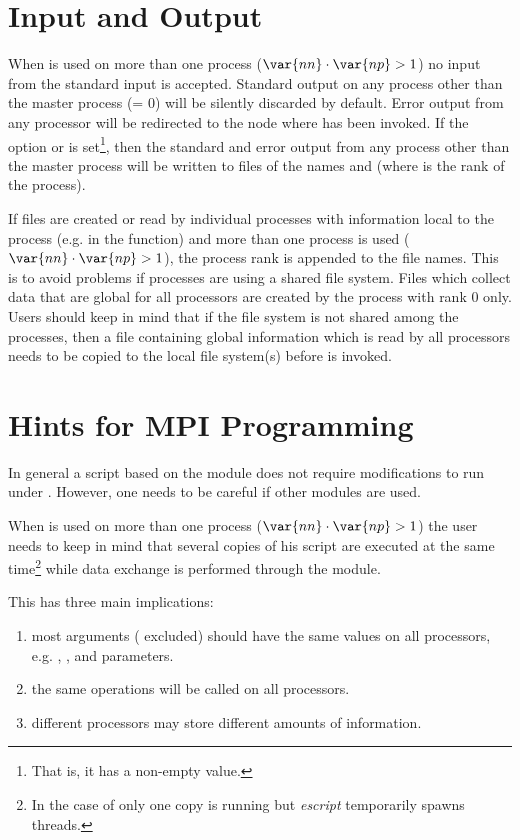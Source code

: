 \section{Input and Output}
When \MPI is used on more than one process ($\var{nn} \cdot \var{np} >1$) no
input from the standard input is accepted.
Standard output on any process other than the master process (= 0)
will be silently discarded by default.
Error output from any processor will be redirected to the node where  has been invoked.
If the  option or  is set\footnote{That is, it has a non-empty value.},
then the standard and error output from any process other than the master
process will be written to files of the names 
and  (where  is the rank of the process).

If files are created or read by individual \MPI processes with information
local to the process (e.g. in the  function)  and more than one
process is used ($\var{nn} \cdot \var{np} >1$), the \MPI process rank is
appended to the file names.
This is to avoid problems if processes are using a shared file system.
Files which collect data that are global for all \MPI processors are created
by the process with \MPI rank 0 only.
Users should keep in mind that if the file system is not shared among the
processes, then a file containing global information which is read by all
processors needs to be copied to the local file system(s) before  is invoked.
 
\section{Hints for MPI Programming}
In general a script based on the \escript module does not require
modifications to run under \MPI.
However, one needs to be careful if other modules are used. 

When \MPI is used on more than one process ($\var{nn} \cdot \var{np} >1$) the
user needs to keep in mind that several copies of his script are executed at
the same time\footnote{In the case of \OPENMP only one copy is running
but {\it escript} temporarily spawns threads.} while data exchange is
performed through the \escript module.

This has three main implications:
\begin{enumerate}
 \item most arguments ( excluded) should have the same values on all
     processors, e.g. , ,  and \numpy parameters.
 \item the same operations will be called on all processors.
 \item different processors may store different amounts of information.
\end{enumerate}

